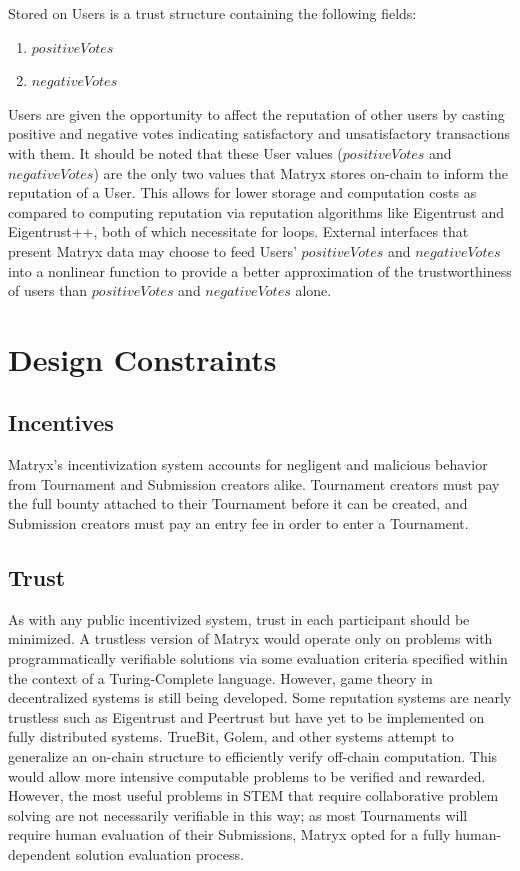 \documentclass[a4paper, 10pt, conference]{ieeeconf}      %
\begin{document}
Stored on Users is a trust structure containing the following fields:
\begin{enumerate}
\item $positiveVotes$
\item $negativeVotes$
\end{enumerate}

Users are given the opportunity to affect the reputation of other users by casting positive and negative votes indicating  satisfactory and unsatisfactory transactions with them.
It should be noted that these User values ($positiveVotes$ and $negativeVotes$) are the only two values that Matryx stores on-chain to inform the reputation of a User. This allows for lower storage and computation costs as compared to computing reputation via reputation algorithms like Eigentrust and Eigentrust++, both of which necessitate for loops. External interfaces that present Matryx data may choose to feed Users' $positiveVotes$ and $negativeVotes$ into a nonlinear function to provide a better approximation of the trustworthiness of users than $positiveVotes$ and $negativeVotes$ alone.

\section{Design Constraints}\label{designconstraints}
\subsection{Incentives}\label{incentives}
Matryx's incentivization system accounts for negligent and malicious behavior from Tournament and Submission creators alike. Tournament creators must pay the full bounty attached to their Tournament before it can be created, and Submission creators must pay an entry fee in order to enter a Tournament. 

\subsection{Trust}\label{trust}
As with any public incentivized system, trust in each participant should be minimized. 
A trustless version of Matryx would operate only on problems with programmatically verifiable solutions via some evaluation criteria specified within the context of a Turing-Complete language.
However, game theory in decentralized systems is still being developed. 
Some reputation systems are nearly trustless such as Eigentrust and Peertrust but have yet to be implemented on fully distributed systems.
TrueBit\cite{teutsch}, Golem\cite{golem}, and other systems attempt to generalize an on-chain structure to efficiently verify off-chain computation\cite{sanjay2016}. 
This would allow more intensive computable problems to be verified and rewarded. 
However, the most useful problems in STEM that require collaborative problem solving are not necessarily verifiable in this way; as most Tournaments will require human evaluation of their Submissions, Matryx opted for a fully human-dependent solution evaluation process.
\end{document}
